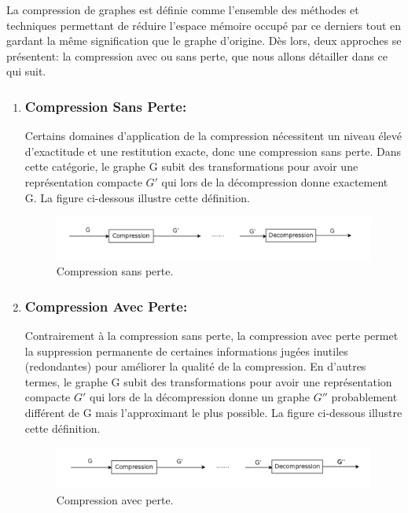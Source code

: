 La compression de graphes est définie comme l'ensemble des méthodes et techniques permettant de réduire l'espace mémoire occupé par ce derniers tout en gardant la même signification que le graphe d'origine. Dès lors, deux approches se présentent: la compression avec ou sans perte, que nous allons détailler dans ce qui suit.
			
			\begin{enumerate}[label=\alph*)]
			\item \subsubsection{Compression Sans Perte:}
			Certains domaines d'application de la compression nécessitent un niveau élevé d'exactitude et une restitution exacte, donc une compression sans perte. Dans cette catégorie, le graphe G subit des transformations pour avoir une représentation compacte $G'$ qui lors de la décompression donne exactement G. La figure ci-dessous illustre cette définition. 
			
			\begin{figure}[h]
			\includegraphics[scale=0.15,center]{./ressources/image/SansPerte.png}
			\caption[Compression sans perte.]{Compression sans perte.}
			\end{figure}
			
			
			\item \subsubsection{Compression Avec Perte:}
			Contrairement à la compression sans perte, la compression avec perte permet la suppression permanente de certaines informations jugées inutiles (redondantes) pour améliorer la qualité de la compression.  En d'autres termes, le graphe G subit des transformations pour avoir une représentation compacte $G'$ qui lors de la décompression donne un graphe $G''$ probablement différent de G mais l'approximant le plus possible. La figure ci-dessous illustre cette définition.   
			
			\begin{figure}[h]
			\includegraphics[scale=0.15,center]{./ressources/image/AvecPerte.png}
			\caption[Compression avec perte.]{Compression avec perte.}
			\end{figure}
			
				\end{enumerate}
			
			
			